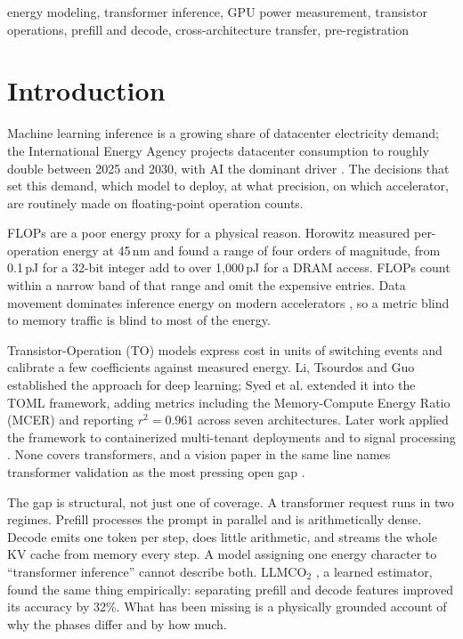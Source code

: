 \documentclass[conference]{IEEEtran}
\begin{document}
\begin{IEEEkeywords}
energy modeling, transformer inference, GPU power measurement, transistor
operations, prefill and decode, cross-architecture transfer, pre-registration
\end{IEEEkeywords}

\section{Introduction}

Machine learning inference is a growing share of datacenter electricity
demand; the International Energy Agency projects datacenter consumption to
roughly double between 2025 and 2030, with AI the dominant driver
\cite{iea2026}. The decisions that set this demand, which model to deploy,
at what precision, on which accelerator, are routinely made on
floating-point operation counts.

FLOPs are a poor energy proxy for a physical reason. Horowitz
\cite{horowitz2014} measured per-operation energy at 45\,nm and found a
range of four orders of magnitude, from 0.1\,pJ for a 32-bit integer add to
over 1{,}000\,pJ for a DRAM access. FLOPs count within a narrow band of that
range and omit the expensive entries. Data movement dominates inference
energy on modern accelerators \cite{sze2017}, so a metric blind to memory
traffic is blind to most of the energy.

Transistor-Operation (TO) models express cost in units of switching events
and calibrate a few coefficients against measured energy. Li, Tsourdos and
Guo \cite{li2024} established the approach for deep learning; Syed et al.
\cite{toml2026flairs} extended it into the TOML framework, adding metrics
including the Memory-Compute Energy Ratio (MCER) and reporting $r^2 =
0.961$ across seven architectures. Later work applied the framework to
containerized multi-tenant deployments \cite{tomlcloud2026} and to signal
processing \cite{tomlsignals2026}. None covers transformers, and a vision
paper in the same line names transformer validation as the most pressing
open gap \cite{tomlvision2026}.

The gap is structural, not just one of coverage. A transformer request runs
in two regimes. Prefill processes the prompt in parallel and is
arithmetically dense. Decode emits one token per step, does little
arithmetic, and streams the whole KV cache from memory every step. A model
assigning one energy character to ``transformer inference'' cannot describe
both. LLMCO$_2$ \cite{llmco2}, a learned estimator, found the same thing
empirically: separating prefill and decode features improved its accuracy by
32\%. What has been missing is a physically grounded account of why the
phases differ and by how much.
\end{document}
